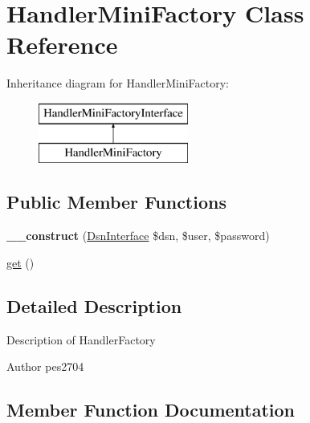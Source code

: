 \hypertarget{class_pes_1_1_database_1_1_handler_1_1_mini_1_1_handler_mini_factory}{}\section{Handler\+Mini\+Factory Class Reference}
\label{class_pes_1_1_database_1_1_handler_1_1_mini_1_1_handler_mini_factory}
Inheritance diagram for Handler\+Mini\+Factory\+:\begin{figure}[H]
\begin{center}
\leavevmode
\includegraphics[height=2.000000cm]{class_pes_1_1_database_1_1_handler_1_1_mini_1_1_handler_mini_factory}
\end{center}
\end{figure}
\subsection*{Public Member Functions}
\begin{DoxyCompactItemize}
\item 
\mbox{\label{class_pes_1_1_database_1_1_handler_1_1_mini_1_1_handler_mini_factory_a1daa9b9b3ebcfd7c1d40cbbe43a9d21b}} 
{\bfseries \+\_\+\+\_\+construct} (\mbox{\hyperlink{interface_pes_1_1_database_1_1_handler_1_1_mini_1_1_dsn_interface}{Dsn\+Interface}} \$dsn, \$user, \$password)
\item 
\mbox{\hyperlink{class_pes_1_1_database_1_1_handler_1_1_mini_1_1_handler_mini_factory_ac33ee765f5ad9f134540bac393721cfe}{get}} ()
\end{DoxyCompactItemize}


\subsection{Detailed Description}
Description of Handler\+Factory

\begin{DoxyAuthor}{Author}
pes2704 
\end{DoxyAuthor}


\subsection{Member Function Documentation}
\mbox{\label{class_pes_1_1_database_1_1_handler_1_1_mini_1_1_handler_mini_factory_ac33ee765f5ad9f134540bac393721cfe}} 

